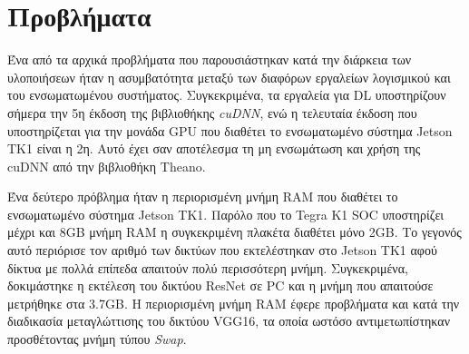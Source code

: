 \section{Προβλήματα}

Ένα από τα αρχικά προβλήματα που παρουσιάστηκαν κατά την διάρκεια των υλοποιήσεων
ήταν η ασυμβατότητα μεταξύ των διαφόρων εργαλείων λογισμικού και του
ενσωματωμένου συστήματος. Συγκεκριμένα, τα εργαλεία για DL υποστηρίζουν σήμερα την 5η έκδοση της βιβλιοθήκης
\emph{cuDNN}, ενώ η τελευταία έκδοση που υποστηρίζεται για την μονάδα GPU που διαθέτει
το ενσωματωμένο σύστημα Jetson TK1 είναι η 2η. Αυτό έχει σαν αποτέλεσμα
τη μη ενσωμάτωση και χρήση της cuDNN από την βιβλιοθήκη Theano.

Ένα δεύτερο πρόβλημα ήταν η περιορισμένη μνήμη RAM που διαθέτει το
ενσωματωμένο σύστημα Jetson TK1. Παρόλο που το Tegra K1 SOC υποστηρίζει
μέχρι και 8GB μνήμη RAM η συγκεκριμένη πλακέτα διαθέτει μόνο 2GB.
Το γεγονός αυτό περιόρισε τον αριθμό των δικτύων που εκτελέστηκαν στο Jetson TK1
αφού δίκτυα με πολλά επίπεδα απαιτούν πολύ περισσότερη μνήμη. Συγκεκριμένα,
δοκιμάστηκε η εκτέλεση του δικτύου
ResNet σε PC και η μνήμη που απαιτούσε μετρήθηκε στα 3.7GB.
Η περιορισμένη μνήμη RAM έφερε προβλήματα και κατά την διαδικασία μεταγλώττισης
του δικτύου VGG16, τα οποία ωστόσο αντιμετωπίστηκαν προσθέτοντας μνήμη τύπου \emph{Swap}.
